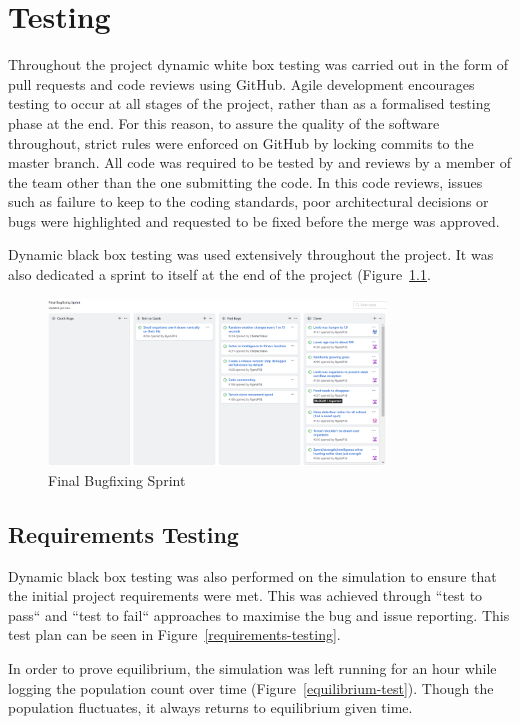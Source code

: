 \documentclass[a4paper, oneside, 11pt]{report}
\begin{document}
\chapter{Testing}\label{testing}
Throughout the project dynamic white box testing was carried out in the form of pull requests and code reviews using GitHub. Agile development encourages testing to occur at all stages of the project, rather than as a formalised testing phase at the end. For this reason, to assure the quality of the software throughout, strict rules were enforced on GitHub by locking commits to the master branch. All code was required to be tested by and reviews by a member of the team other than the one submitting the code. In this code reviews, issues such as failure to keep to the coding standards, poor architectural decisions or bugs were highlighted and requested to be fixed before the merge was approved.

Dynamic black box testing was used extensively throughout the project. It was also dedicated a sprint to itself at the end of the project (Figure~\ref{gitbugfixing}.

\begin{figure}[H]
	\caption{Final Bugfixing Sprint}\label{gitbugfixing}
	\centering
	\includegraphics[width=0.8\textwidth]{gitbugfixing}
\end{figure}

\section{Requirements Testing}
Dynamic black box testing was also performed on the simulation to ensure that the initial project requirements were met. This was achieved through ``test to pass`` and ``test to fail`` approaches to maximise the bug and issue reporting. This test plan can be seen in Figure~\ref{requirements-testing}.

In order to prove equilibrium, the simulation was left running for an hour while logging the population count over time (Figure~\ref{equilibrium-test}). Though the population fluctuates, it always returns to equilibrium given time.
	
\end{document}
